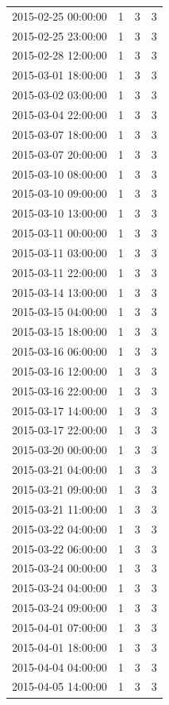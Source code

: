 \begin{tabular}{lrrr}
2015-02-25 00:00:00 & 1 & 3 & 3 \\
2015-02-25 23:00:00 & 1 & 3 & 3 \\
2015-02-28 12:00:00 & 1 & 3 & 3 \\
2015-03-01 18:00:00 & 1 & 3 & 3 \\
2015-03-02 03:00:00 & 1 & 3 & 3 \\
2015-03-04 22:00:00 & 1 & 3 & 3 \\
2015-03-07 18:00:00 & 1 & 3 & 3 \\
2015-03-07 20:00:00 & 1 & 3 & 3 \\
2015-03-10 08:00:00 & 1 & 3 & 3 \\
2015-03-10 09:00:00 & 1 & 3 & 3 \\
2015-03-10 13:00:00 & 1 & 3 & 3 \\
2015-03-11 00:00:00 & 1 & 3 & 3 \\
2015-03-11 03:00:00 & 1 & 3 & 3 \\
2015-03-11 22:00:00 & 1 & 3 & 3 \\
2015-03-14 13:00:00 & 1 & 3 & 3 \\
2015-03-15 04:00:00 & 1 & 3 & 3 \\
2015-03-15 18:00:00 & 1 & 3 & 3 \\
2015-03-16 06:00:00 & 1 & 3 & 3 \\
2015-03-16 12:00:00 & 1 & 3 & 3 \\
2015-03-16 22:00:00 & 1 & 3 & 3 \\
2015-03-17 14:00:00 & 1 & 3 & 3 \\
2015-03-17 22:00:00 & 1 & 3 & 3 \\
2015-03-20 00:00:00 & 1 & 3 & 3 \\
2015-03-21 04:00:00 & 1 & 3 & 3 \\
2015-03-21 09:00:00 & 1 & 3 & 3 \\
2015-03-21 11:00:00 & 1 & 3 & 3 \\
2015-03-22 04:00:00 & 1 & 3 & 3 \\
2015-03-22 06:00:00 & 1 & 3 & 3 \\
2015-03-24 00:00:00 & 1 & 3 & 3 \\
2015-03-24 04:00:00 & 1 & 3 & 3 \\
2015-03-24 09:00:00 & 1 & 3 & 3 \\
2015-04-01 07:00:00 & 1 & 3 & 3 \\
2015-04-01 18:00:00 & 1 & 3 & 3 \\
2015-04-04 04:00:00 & 1 & 3 & 3 \\
2015-04-05 14:00:00 & 1 & 3 & 3 \\

\end{tabular}
